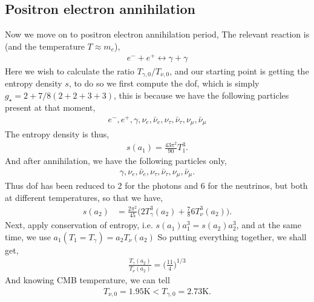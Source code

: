 \documentclass[a4paper, 12pt]{article}
\begin{document}
{{\subsection{Positron electron annihilation}%
  \label{sub:Positron electron annihilation}
  Now we move on to positron electron annihilation period, 
  The relevant reaction is (and the temperature \( T \approx m_e \)), 
  \begin{align}
    \label{Positron electron annihilation}
    e^- + e^+ \leftrightarrow \gamma + \gamma
  \end{align}
  Here we wish to calculate the ratio \( T_{\gamma, 0}/T_{\nu, 0} \), and
  our starting point is getting the entropy density \( s \), to do so we
  first compute the dof, which is simply \( g_{\star} = 2 + 7/8(2 + 2 +
  3 + 3) \), this is because we have the following particles present at
  that moment, 
  \begin{align}
    \label{ particles present in p e annihilation }
    e^-, e^+, \gamma, \nu_{e}, \bar{\nu}_e, \nu_{\tau},
    \bar{\nu}_{\tau}, \nu_{\mu}, \bar{\nu}_{\mu}
  \end{align}
  The entropy density is thus, 
  \begin{align}
    \label{entropy density at p e annihilation}
    s(a_1) = \frac{43\pi^2}{90} T_{1}^{3}.
  \end{align}
  And after annihilation, we have the following particles only, 
  \begin{align}
    \label{particles present after p e annihilation}
     \gamma, \nu_{e}, \bar{\nu}_e, \nu_{\tau},
    \bar{\nu}_{\tau}, \nu_{\mu}, \bar{\nu}_{\mu}.
  \end{align}
  Thus dof has been reduced to 2 for the photons and 6 for the neutrinos,
  but both at different temperatures, so that we have, 
  \begin{align}
    \label{entropy density after p e annihilation}
    s(a_2) &= \frac{2\pi^2}{45} \bigg( 2 T_{\gamma}^{3}(a_2) +
    \frac{7}{8} 6 T_{\nu}^{3} (a_2) \bigg).
  \end{align}
  Next, apply conservation of entropy, i.e. \( s(a_1) a_{1}^{3} = s(a_2)
  a_{2}^{3} \), and at the same time, we use \( a_1 (T_1 =
  T_{\gamma}) = a_2
  T_{\nu}(a_2) \)
  So putting everything together, we shall get, 
  \begin{align}
    \label{radiation neutrino ratio}
    \frac{T_{\gamma}(a_2)}{T_{\nu}(a_2)} = \bigg( \frac{11}{4}
    \bigg)^{1/3} 
  \end{align}
  And knowing CMB temperature, we can tell 
  \begin{align}
    \label{final neutrino temperature}
    T_{\nu, 0} = 1.95 \mathrm{K} < T_{\gamma, 0} = 2.73 \mathrm{K}. 
  \end{align}



}}
\end{document}
